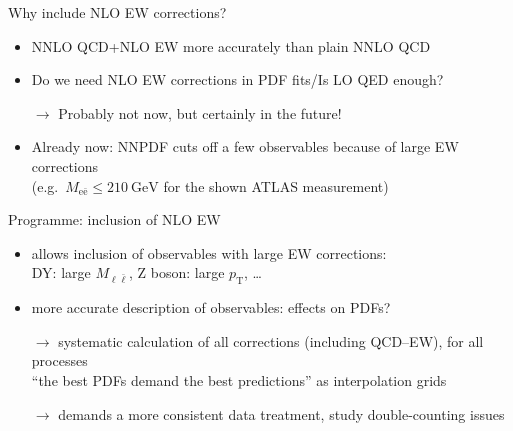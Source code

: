 \begin{frame}{Why include NLO EW corrections?}
\begin{itemize}
\item NNLO QCD+NLO EW more accurately than plain NNLO QCD
\item Do we need NLO EW corrections in PDF fits/Is LO QED enough?
\item[$\rightarrow$] Probably not now, but certainly in the future!
\item Already now: NNPDF cuts off a few observables because of large EW corrections\\
(e.g.\ $M_{\mathrm{e} \bar{\mathrm{e}}} \le \SI{210}{\giga\electronvolt}$ for the shown ATLAS measurement)
\end{itemize}
\vspace*{\fill}
\begin{block}{Programme: inclusion of NLO EW}
\begin{itemize}
\item allows \alert{inclusion} of observables with large EW corrections:\\
DY: large $M_{\ell \bar{\ell}}$, Z boson: large $p_\mathrm{T}$, \ldots
\item more \alert{accurate description} of observables: effects on PDFs?
\item[$\rightarrow$] systematic calculation of \alert{all} corrections (including QCD--EW), for \alert{all} processes\\
\enquote{the best PDFs demand the best predictions} as \alert{interpolation grids}
\item[$\rightarrow$] demands a more consistent data treatment, study \alert{double-counting} issues
\end{itemize}
\end{block}
\end{frame}

